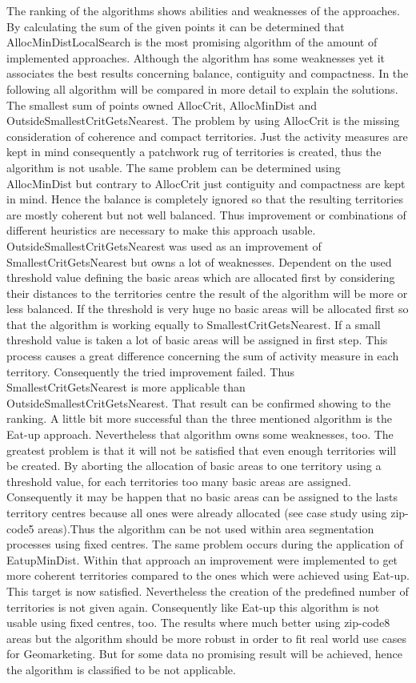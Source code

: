 The ranking of the algorithms shows abilities and weaknesses of the approaches. By calculating the sum of the given points it can be determined that AllocMinDistLocalSearch is the most promising algorithm of the amount of implemented approaches. Although the algorithm has some weaknesses yet it associates the best results concerning balance, contiguity and compactness. In the following all algorithm will be compared in more detail to explain the solutions. The smallest sum of points owned AllocCrit, AllocMinDist and OutsideSmallestCritGetsNearest. The problem by using AllocCrit is the missing consideration of coherence and compact territories. Just the activity measures are kept in mind consequently a patchwork rug of territories is created, thus the algorithm is not usable. The same problem can be determined using AllocMinDist but contrary to AllocCrit just contiguity and compactness are kept in mind. Hence the balance is completely ignored so that the resulting territories are mostly coherent but not well balanced. Thus improvement or combinations of different heuristics are necessary to make this approach usable. \\OutsideSmallestCritGetsNearest was used as an improvement of SmallestCritGetsNearest but owns a lot of weaknesses. Dependent on the used threshold value defining the basic areas which are allocated first by considering their distances to the territories centre the result of the algorithm will be more or less balanced. If the threshold is very huge no basic areas will be allocated first so that the algorithm is working equally to SmallestCritGetsNearest. If a small threshold value is taken a lot of basic areas will be assigned in first step. This process causes a great difference concerning the sum of activity measure in each territory. Consequently the tried improvement failed. Thus SmallestCritGetsNearest is more applicable than OutsideSmallestCritGetsNearest. That result can be confirmed showing to the ranking. A little bit more successful than the three mentioned algorithm is the Eat-up approach. Nevertheless that algorithm owns some weaknesses, too. The greatest problem is that it will not be satisfied that even enough territories will be created. By aborting the allocation of basic areas to one territory using a threshold value, for each territories too many basic areas are assigned. Consequently it may be happen that no basic areas can be assigned to the lasts territory centres because all ones were already allocated (see case study using zip-code5 areas).Thus the algorithm can be not used within area segmentation processes using fixed centres. The same problem occurs during the application of EatupMinDist. Within that approach an improvement were implemented to get more coherent territories compared to the ones which were achieved using Eat-up. This target is now satisfied. Nevertheless the creation of the predefined number of territories is not given again. Consequently like Eat-up this algorithm is not usable using fixed centres, too. The results where much better using zip-code8 areas but the algorithm should be more robust in order to fit real world use cases for Geomarketing. But for some data no promising result will be achieved, hence the algorithm is classified to be not applicable. 